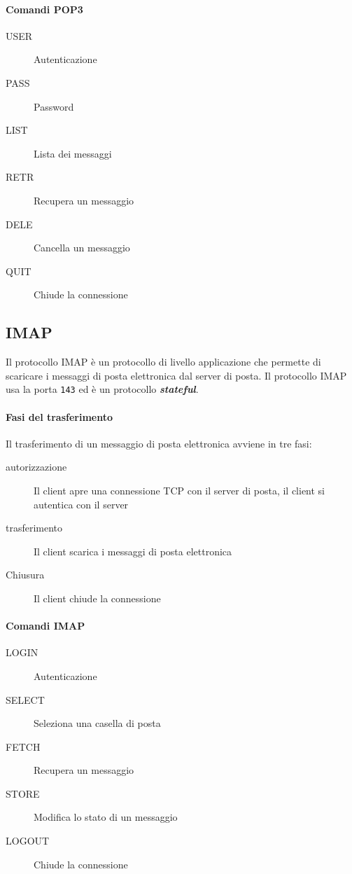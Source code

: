         \paragraph{Comandi \Acrshort*{POP3}}
            \begin{description}
                \item[USER] Autenticazione
                \item[PASS] Password
                \item[LIST] Lista dei messaggi
                \item[RETR] Recupera un messaggio
                \item[DELE] Cancella un messaggio
                \item[QUIT] Chiude la connessione
            \end{description}
    \subsection[Internet Message Access Protocol (\texttt{IMAP})]{\acrfull*{IMAP}}
        Il protocollo \acrfull*{IMAP} è un protocollo di livello applicazione che permette di scaricare i messaggi di posta elettronica dal server di posta. Il protocollo \Acrshort*{IMAP} usa la porta \texttt{143} ed è un protocollo \textit{\textbf{stateful}}.
        \paragraph{Fasi del trasferimento} Il trasferimento di un messaggio di posta elettronica avviene in tre fasi:
            \begin{description}
                \item[autorizzazione] Il client apre una connessione \Acrshort*{TCP} con il server di posta, il client si autentica con il server
                \item[trasferimento] Il client scarica i messaggi di posta elettronica
                \item[Chiusura] Il client chiude la connessione
            \end{description}
        \paragraph{Comandi \Acrshort*{IMAP}}
            \begin{description}
                \item[LOGIN] Autenticazione
                \item[SELECT] Seleziona una casella di posta
                \item[FETCH] Recupera un messaggio
                \item[STORE] Modifica lo stato di un messaggio
                \item[LOGOUT] Chiude la connessione
            \end{description}
